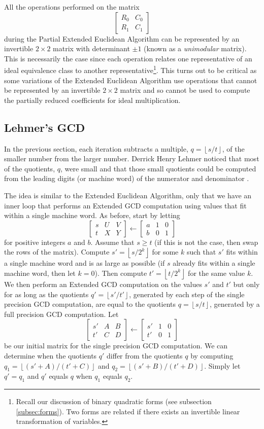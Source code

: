 \documentclass{ucalgthes1}
\theoremstyle{definition}
\newcommand{\matrixtt}[4]{\left[ \begin{array}{rr} #1 & #2 \\ #3 & #4 \end{array} \right]}
\newcommand{\matrixThreeTwo}[6]{\left[ \begin{array}{rrr} #1 & #2 & #3 \\ #4 & #5 & #6 \end{array} \right]}
\newcommand{\floor}[1]{\left\lfloor #1 \right\rfloor}
\begin{document}
All the operations performed on the matrix
\[
\matrixtt{R_0}{C_0}{R_1}{C_1}
\]
during the Partial Extended Euclidean Algorithm can be represented by an invertible $2 \times 2$ matrix with determinant $\pm 1$ (known as a \emph{unimodular} matrix).  This is necessarily the case since each operation relates one representative of an ideal equivalence class to another representative\footnote{Recall our discussion of binary quadratic forms (see subsection \ref{subsec:forms}). Two forms are related if there exists an invertible linear transformation of variables.}. This turns out to be critical as some variations of the Extended Euclidean Algorithm use operations that cannot be represented by an invertible $2 \times 2$ matrix and so cannot be used to compute the partially reduced coefficients for ideal multiplication.

\subsection{Lehmer's GCD}

In the previous section, each iteration subtracts a multiple, $q = \floor{s / t}$, of the smaller number from the larger number.  Derrick Henry Lehmer noticed that most of the quotients, $q$, were small and that those small quotients could be computed from the leading digits (or machine word) of the numerator and denominator \cite{Lehmer1938}.

The idea is similar to the Extended Euclidean Algorithm, only that we have an inner loop that performs an Extended GCD computation using values that fit within a single machine word.  As before, start by letting
\[
	\matrixThreeTwo{s}{U}{V}{t}{X}{Y} \gets \matrixThreeTwo{a}{1}{0}{b}{0}{1}
\]
for positive integers $a$ and $b$.  Assume that $s \ge t$ (if this is not the case, then swap the rows of the matrix).  Compute $s'=\floor{s/2^k}$ for some $k$ such that $s'$ fits within a single machine word and is as large as possible (if $s$ already fits within a single machine word, then let $k=0$).  Then compute $t' = \floor{t/2^k}$ for the same value $k$.  We then perform an Extended GCD computation on the values $s'$ and $t'$ but only for as long as the quotients $q'=\floor{s'/t'}$, generated by each step of the single precision GCD computation, are equal to the quotients $q=\floor{s/t}$, generated by a full precision GCD computation.  Let
\[
\matrixThreeTwo{s'}{A}{B}{t'}{C}{D} \gets \matrixThreeTwo{s'}{1}{0}{t'}{0}{1}
\]
be our initial matrix for the single precision GCD computation.  We can determine when the quotients $q'$ differ from the quotients $q$ by computing $q_1 = \floor{(s'+A)/(t'+C)}$ and $q_2 = \floor{(s'+B)/(t'+D)}$.  Simply let $q' = q_1$ and $q'$ equals $q$ when $q_1$ equals $q_2$.
\end{document}
